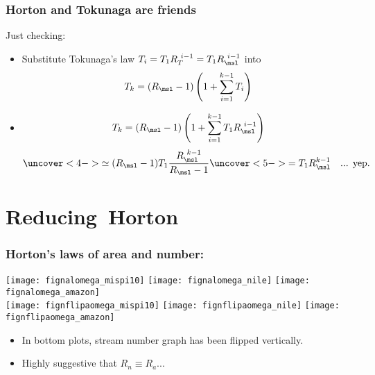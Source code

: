 \begin{frame}[label=]
  \frametitle{Horton and Tokunaga are friends}

  \begin{block}{Just checking:}
    \begin{itemize}
    \item<1-> Substitute Tokunaga's law $T_i=T_1 R_T^{\ i-1} = T_1 R_\msl^{\ i-1}$ into
      $$
      T_{k} = (R_\msl-1)
      \left(
        1 +
        \sum_{i=1}^{k-1} T_{i}  
      \right)
      $$
    \item<2->
        $$ 
        T_{k} 
        = 
        (R_\msl-1)
        \left(
          1 + 
          \sum_{i=1}^{k-1} 
          T_1 R_\msl^{\ i-1}
        \right) 
        $$
        $$ 
        \uncover<4->{
          \simeq 
          (R_\msl-1) T_1 \frac{R_\msl^{\ k-1}}{R_\msl - 1} 
        }
        \uncover<5->{ 
          = T_1 R_\msl^{k-1}  \quad \mbox{... yep.}
        }
        $$
    \end{itemize}
  \end{block}
  
\end{frame}


\section{Reducing\ Horton}

\begin{frame}[label=]
  \frametitle{Horton's laws of area and number:}

  \begin{block}{}
    \begin{center}
      \texttt{[image: fignalomega\_mispi10]} 
      \texttt{[image: fignalomega\_nile]} 
      \texttt{[image: fignalomega\_amazon]} \\
      \texttt{[image: fignflipaomega\_mispi10]} 
      \texttt{[image: fignflipaomega\_nile]} 
      \texttt{[image: fignflipaomega\_amazon]} 
    \end{center}
    \begin{itemize}
    \item<1-> 
       In bottom plots, stream number graph has been flipped vertically.
    \item<+-> 
      Highly suggestive that $R_n \equiv R_a$...
    \end{itemize}
  \end{block}

\end{frame}

